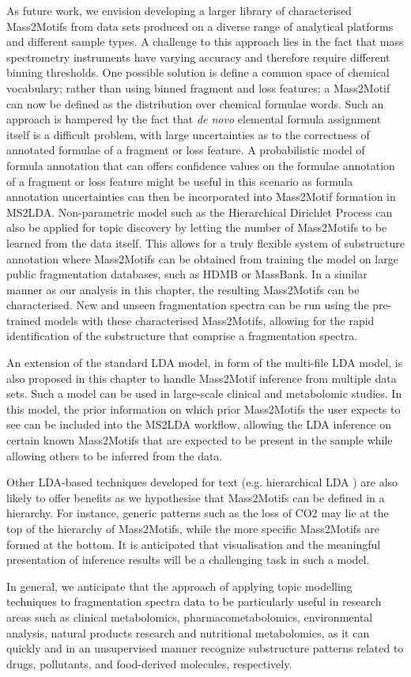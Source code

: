 As future work, we envision developing a larger library of characterised Mass2Motifs from data sets produced on a diverse range of analytical platforms and different sample types. A challenge to this approach lies in the fact that mass spectrometry instruments have varying accuracy and therefore require different binning thresholds. One possible solution is define a common space of chemical vocabulary; rather than using binned fragment and loss features; a Mass2Motif can now be defined as the distribution over chemical formulae words. Such an approach is hampered by the fact that \textit{de novo} elemental formula assignment itself is a difficult problem, with large uncertainties as to the correctness of annotated formulae of a fragment or loss feature. A probabilistic model of formula annotation that can offers confidence values on the formulae annotation of a fragment or loss feature might be useful in this scenario as formula annotation uncertainties can then be incorporated into Mass2Motif formation in MS2LDA. Non-parametric model such as the Hierarchical Dirichlet Process \cite{Teh2006} can also be applied for topic discovery by letting the number of Mass2Motifs to be learned from the data itself. This allows for a truly flexible system of substructure annotation where Mass2Motifs can be obtained from training the model on large public fragmentation databases, such as HDMB or MassBank. In a similar manner as our analysis in this chapter, the resulting Mass2Motifs can be characterised. New and unseen fragmentation spectra can be run using the pre-trained models with these characterised Mass2Motifs, allowing for the rapid identification of the substructure that comprise a fragmentation spectra.

An extension of the standard LDA model, in form of the multi-file LDA model, is also proposed in this chapter to handle Mass2Motif inference from multiple data sets. Such a model can be used in large-scale clinical and metabolomic studies. In this model, the prior information on which prior Mass2Motifs the user expects to see can be included into the MS2LDA workflow, allowing the LDA inference on certain known Mass2Motifs that are expected to be present in the sample while allowing others to be inferred from the data.

Other LDA-based techniques developed for text (e.g. hierarchical LDA \cite{griffiths2004hierarchical}) are also likely to offer benefits as we hypothesise that Mass2Motifs can be defined in a hierarchy. For instance, generic patterns such as the loss of CO2 may lie at the top of the hierarchy of Mass2Motifs, while the more specific Mass2Motifs are formed at the bottom. It is anticipated that visualisation and the meaningful presentation of inference results will be a challenging task in such a model. 

In general, we anticipate that the approach of applying topic modelling techniques to fragmentation spectra data to be particularly useful in research areas such as clinical metabolomics, pharmacometabolomics, environmental analysis, natural products research and nutritional metabolomics, as it can quickly and in an unsupervised manner recognize substructure patterns related to drugs, pollutants, and food-derived molecules, respectively. 